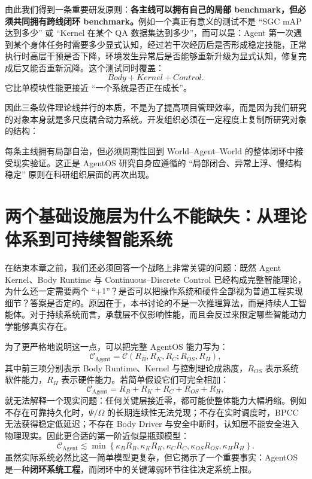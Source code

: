 由此我们得到一条重要研发原则：\textbf{各主线可以拥有自己的局部 benchmark，但必须共同拥有跨线闭环 benchmark。}例如一个真正有意义的测试不是 ``SGC mAP 达到多少'' 或 ``Kernel 在某个 QA 数据集达到多少''，而可以是：Agent 第一次遇到某个身体任务时需要多少显式认知，经过若干次经历后是否形成稳定技能，正常执行时高层干预是否下降，环境发生异常后是否能够重新升级为显式认知，修复完成后又能否重新沉降。这个测试同时覆盖：
\[
Body
+
Kernel
+
Control.
\]
它比单模块性能更接近 ``一个系统是否正在成长''。

因此三条软件理论线并行的本质，不是为了提高项目管理效率，而是因为我们研究的对象本身就是多尺度耦合动力系统。开发组织必须在一定程度上复制所研究对象的结构：
\begin{statementbox}
\centering
{}
\end{statementbox}
每条主线拥有局部自治，但必须周期性回到 World--Agent--World 的整体闭环中接受现实验证。这正是 AgentOS 研究自身应遵循的 ``局部闭合、异常上浮、慢结构稳定'' 原则在科研组织层面的再次出现。

\section{两个基础设施层为什么不能缺失：从理论体系到可持续智能系统}
\label{sec:roadmap-two-plus-one-necessity}

在结束本章之前，我们还必须回答一个战略上非常关键的问题：既然 Agent Kernel、Body Runtime 与 Continuous--Discrete Control 已经构成完整智能理论，为什么还一定需要两个 ``+1''？是否可以把操作系统和硬件全部视为普通工程实现细节？答案是否定的。原因在于，本书讨论的不是一次推理算法，而是持续人工智能体。对于持续系统而言，承载层不仅影响性能，而且会反过来限定哪些智能动力学能够真实存在。

为了更严格地说明这一点，可以把完整 AgentOS 能力写为：
\[
\mathcal C_{\mathrm{Agent}}
=
\mathcal C
\left(
R_B,
R_K,
R_C;
R_{OS},
R_H
\right),
\]
其中前三项分别表示 Body Runtime、Kernel 与控制理论成熟度，$R_{OS}$ 表示系统软件能力，$R_H$ 表示硬件能力。若简单假设它们可完全相加：
\[
\mathcal C_{\mathrm{Agent}}
=
R_B+R_K+R_C+R_{OS}+R_H,
\]
就无法解释一个现实问题：任何关键层接近零，都可能使整体能力大幅坍缩。例如不存在可靠持久化时，$\Psi/\Omega$ 的长期连续性无法兑现；不存在实时调度时，BPCC 无法获得稳定低延迟；不存在 Body Driver 与安全中断时，认知层不能安全进入物理现实。因此更合适的第一阶近似是瓶颈模型：
\[
\boxed{
\mathcal C_{\mathrm{Agent}}
\lesssim
\min
\left\{
\kappa_B R_B,
\kappa_K R_K,
\kappa_C R_C,
\kappa_{OS}R_{OS},
\kappa_HR_H
\right\}.
}
\]
虽然实际系统必然比这一简单模型更复杂，但它揭示了一个重要事实：AgentOS 是一种\textbf{闭环系统工程}，而闭环中的关键薄弱环节往往决定系统上限。

